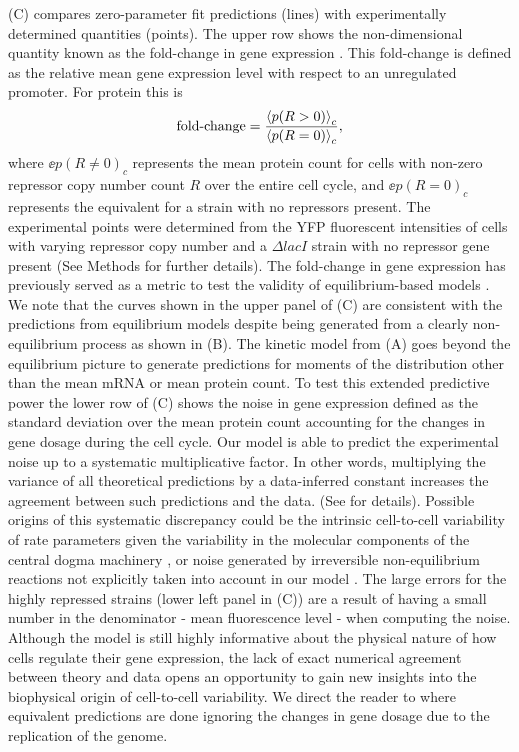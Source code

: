 (C) compares zero-parameter fit predictions (lines) with
experimentally determined quantities (points). The upper row shows the
non-dimensional quantity known as the fold-change in gene expression
\cite{Garcia2011c}. This fold-change is defined as the relative mean gene
expression level with respect to an unregulated promoter. For protein this is
\begin{equation}
	\text{fold-change} = {\left\langle p(R > 0) \right\rangle_c \over \left\langle p(R = 0) \right\rangle_c},
\end{equation}
where $\ee{p(R \neq 0)}_c$ represents the mean protein count for cells with
non-zero repressor copy number count $R$ over the entire cell cycle, and
$\ee{p(R = 0)}_c$ represents the equivalent for a strain with no repressors
present. The experimental points were determined from the YFP fluorescent
intensities of cells with varying repressor copy number and a $\Delta lacI$
strain with no repressor gene present (See Methods for further details). The
fold-change in gene expression has previously served as a metric to test the
validity of equilibrium-based models \cite{Phillips2015}. We note that the
curves shown in the upper panel of (C) are consistent
with the predictions from equilibrium models \cite{Razo-Mejia2018} despite
being generated from a clearly non-equilibrium process as shown in
(B). The kinetic model from (A)
goes beyond the equilibrium picture to generate predictions for moments of the
distribution other than the mean mRNA or mean protein count. To test this
extended predictive power the lower row of (C) shows the
noise in gene expression defined as the standard deviation over the mean
protein count accounting for the changes in gene dosage during the cell cycle.
Our model is able to predict the experimental noise up to a systematic
multiplicative factor. In other words, multiplying the variance of all
theoretical predictions by a data-inferred constant increases the agreement
between such predictions and the data. (See  for
details). Possible origins of this systematic discrepancy could be the intrinsic
cell-to-cell variability of rate parameters given the variability in the
molecular components of the central dogma machinery \cite{Jones2014a}, or noise
generated by irreversible non-equilibrium reactions not explicitly taken into
account in our model \cite{Grah2020}. The large errors for the highly repressed
strains (lower left panel in (C)) are a result of having a
small number in the denominator - mean fluorescence level - when computing the
noise. Although the model is still highly informative about the physical nature
of how cells regulate their gene expression, the lack of exact numerical
agreement between theory and data opens an opportunity to gain new insights into
the biophysical origin of cell-to-cell variability. We direct the reader to
 where equivalent predictions are done ignoring the
changes in gene dosage due to the replication of the genome.

